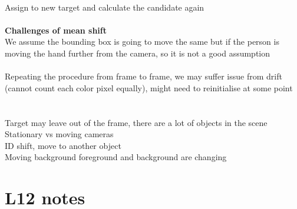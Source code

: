 \documentclass[11pt]{article}
\begin{document}
\\
Assign to new target and calculate the candidate again\\\\
\textbf{Challenges of mean shift}\\
We assume the bounding box is going to move the same but if the person is moving the hand further from the camera, so it is not a good assumption
\\\\
Repeating the procedure from frame to frame, we may suffer issue from drift (cannot count each color pixel equally), might need to reinitialise at some point\\\\
\\
Target may leave out of the frame, there are a lot of objects in the scene\\
Stationary vs moving cameras\\
ID shift, move to another object\\
Moving background foreground and background are changing 
\\
\section*{L12 notes}
\end{document}
